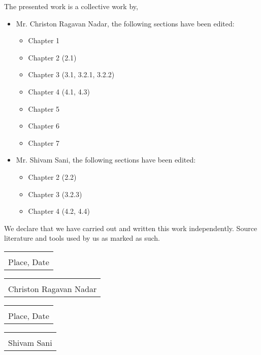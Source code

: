 \documentclass[
11pt, %
english, %
singlespacing, %
headsepline, %
]{mediaproject} %
\begin{document}
\begin{DeclarationOFIndependence}
\addchaptertocentry{\DeclarationOIname} 
The presented work is a collective work by,

\begin{itemize} 
    \item Mr. Christon Ragavan Nadar, the following sections have been edited:
    \begin{itemize} 
    \item Chapter 1 
    \item Chapter 2 (2.1) 
    \item Chapter 3 (3.1, 3.2.1, 3.2.2)
    \item Chapter 4 (4.1, 4.3)
    \item Chapter 5
    \item Chapter 6
    \item Chapter 7
    \end{itemize}
\end{itemize}



\begin{itemize}
\item Mr. Shivam Sani, the following sections have been edited:
\begin{itemize}
    \item Chapter 2 (2.2) 
    \item Chapter 3 (3.2.3)
    \item Chapter 4 (4.2, 4.4)
\end{itemize}
\end{itemize}


We declare that we have carried out and written this work independently. Source literature and tools used by us as marked as such.




\vspace{2cm}
\begin{tabular}{p{5cm}}
	\dotfill \\
	Place, Date
\end{tabular}
\hfill
\begin{tabular}{p{5cm}}
	\dotfill \\
	Christon Ragavan Nadar
\end{tabular}

\vspace{2cm}
\begin{tabular}{p{5cm}}
	\dotfill \\
	Place, Date
\end{tabular}
\hfill
\begin{tabular}{p{5cm}}
	\dotfill \\
	Shivam Sani
\end{tabular}


\end{DeclarationOFIndependence}
\newpage
\end{document}
